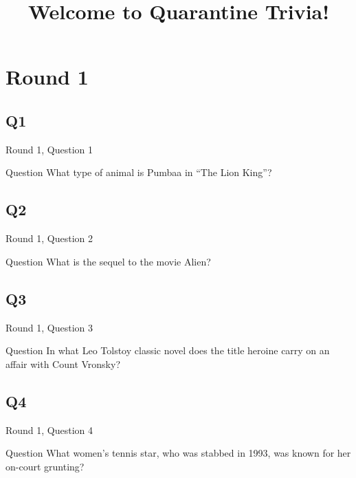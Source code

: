 \documentclass[11pt]{beamer}
\begin{document}
\title{Welcome to Quarantine Trivia!}
\date{}

\begin{frame}
\titlepage{}
\end{frame}
    

\section{Round 1}
    

\subsection*{Q1}
\begin{frame}[t]{Round 1, Question 1}
\vspace{2em}
\begin{block}{Question}
What type of animal is Pumbaa in ``The Lion King''\@?
\end{block}
\end{frame}
    

\subsection*{Q2}
\begin{frame}[t]{Round 1, Question 2}
\vspace{2em}
\begin{block}{Question}
What is the sequel to the movie Alien\@?
\end{block}
\end{frame}
    

\subsection*{Q3}
\begin{frame}[t]{Round 1, Question 3}
\vspace{2em}
\begin{block}{Question}
In what Leo Tolstoy classic novel does the title heroine carry on an affair with Count Vronsky\@?
\end{block}
\end{frame}
    

\subsection*{Q4}
\begin{frame}[t]{Round 1, Question 4}
\vspace{2em}
\begin{block}{Question}
What women's tennis star, who was stabbed in 1993, was known for her on-court grunting\@?
\end{block}
\end{frame}
    
\end{document}
